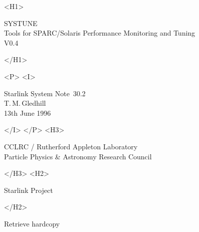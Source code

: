 \documentclass[11pt]{article}
\newcommand{\stardoccategory}  {Starlink System Note}
\newcommand{\stardocnumber}    {30.2}
\newcommand{\stardocsource}    {ssn\stardocnumber}
\newcommand{\stardocauthors}   {T.\,M.\,Gledhill}
\newcommand{\stardocdate}      {13th June 1996}
\newcommand{\stardoctitle}     {SYSTUNE\\[1ex]
 Tools for SPARC/Solaris Performance Monitoring and Tuning\\[1ex]
V0.4}
\newcommand{\htmladdnormallink}[2]{#1}
\newcommand{\htmladdimg}[1]{}
\newcommand{\htmlref}[2]{#1}
\newcommand{\htmladdtonavigation}[1]{}
\newcommand{\xlabel}[1]{}
\begin{document}
\begin{htmlonly}
   \xlabel{}
   \begin{rawhtml} <H1> \end{rawhtml}
      \stardoctitle
   \begin{rawhtml} </H1> \end{rawhtml}


   \begin{rawhtml} <P> <I> \end{rawhtml}
   \stardoccategory\ \stardocnumber \\
   \stardocauthors \\
   \stardocdate
   \begin{rawhtml} </I> </P> <H3> \end{rawhtml}
      \htmladdnormallink{CCLRC}{http://www.cclrc.ac.uk} /
      \htmladdnormallink{Rutherford Appleton Laboratory}
                        {http://www.cclrc.ac.uk/ral} \\
      Particle Physics \& Astronomy Research Council \\
   \begin{rawhtml} </H3> <H2> \end{rawhtml}
      \htmladdnormallink{Starlink Project}{http://star-www.rl.ac.uk/}
   \begin{rawhtml} </H2> \end{rawhtml}
   \htmladdnormallink{\htmladdimg{source.gif} Retrieve hardcopy}
      {http://star-www.rl.ac.uk/cgi-bin/hcserver?\stardocsource}\\



\end{htmlonly}
\end{document}
